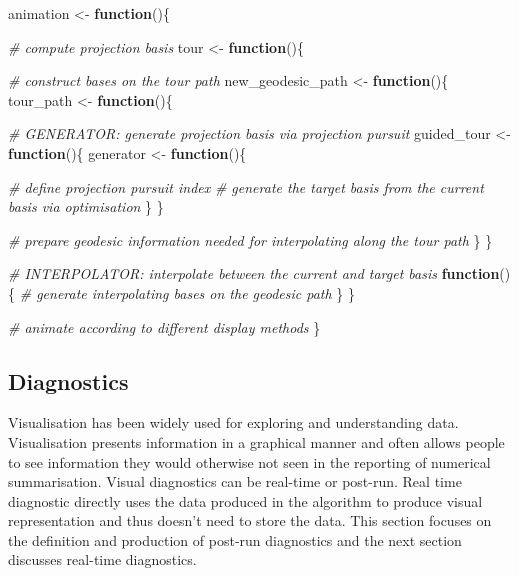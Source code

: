 \documentclass[12pt]{article}
\newenvironment{Shaded}{\begin{snugshade}}{\end{snugshade}}
\newcommand{\CommentTok}[1]{\textcolor[rgb]{0.56,0.35,0.01}{\textit{#1}}}
\newcommand{\ControlFlowTok}[1]{\textcolor[rgb]{0.13,0.29,0.53}{\textbf{#1}}}
\newcommand{\NormalTok}[1]{#1}
\newcommand{\StringTok}[1]{\textcolor[rgb]{0.31,0.60,0.02}{#1}}
\begin{document}
\begin{Shaded}
\begin{Highlighting}[]
\NormalTok{animation <-}\StringTok{ }\ControlFlowTok{function}\NormalTok{()\{}
  
  \CommentTok{# compute projection basis }
\NormalTok{  tour <-}\StringTok{ }\ControlFlowTok{function}\NormalTok{()\{}
    
    \CommentTok{# construct bases on the tour path}
\NormalTok{    new_geodesic_path <-}\StringTok{ }\ControlFlowTok{function}\NormalTok{()\{}
\NormalTok{      tour_path <-}\StringTok{ }\ControlFlowTok{function}\NormalTok{()\{}
        
        \CommentTok{# GENERATOR: generate projection basis via projection pursuit}
\NormalTok{        guided_tour <-}\StringTok{ }\ControlFlowTok{function}\NormalTok{()\{}
\NormalTok{          generator <-}\StringTok{ }\ControlFlowTok{function}\NormalTok{()\{}
            
            \CommentTok{# define projection pursuit index}
            \CommentTok{# generate the target basis from the current basis via optimisation}
\NormalTok{          \}}
\NormalTok{        \}}
        
        \CommentTok{# prepare geodesic information needed for interpolating along the tour path}
\NormalTok{      \}}
\NormalTok{    \}}
    
    \CommentTok{# INTERPOLATOR: interpolate between the current and target basis }
    \ControlFlowTok{function}\NormalTok{()\{}
      \CommentTok{# generate interpolating bases on the geodesic path}
\NormalTok{    \}}
\NormalTok{  \}}
  
  \CommentTok{# animate according to different display methods}
\NormalTok{\}}
\end{Highlighting}
\end{Shaded}

\hypertarget{diagnostics}{%
\subsection{Diagnostics}\label{diagnostics}}

Visualisation has been widely used for exploring and understanding data.
Visualisation presents information in a graphical manner and often
allows people to see information they would otherwise not seen in the
reporting of numerical summarisation. Visual diagnostics can be
real-time or post-run. Real time diagnostic directly uses the data
produced in the algorithm to produce visual representation and thus
doesn't need to store the data. This section focuses on the definition
and production of post-run diagnostics and the next section discusses
real-time diagnostics.
\end{document}
